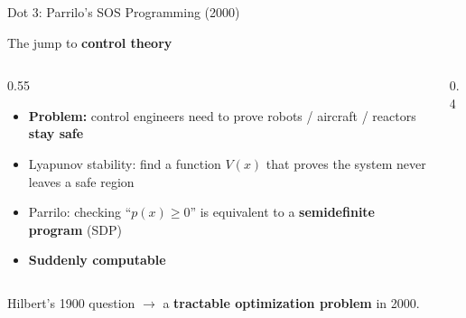 \documentclass[aspectratio=169]{beamer}
\begin{document}
\begin{frame}{Dot 3: Parrilo's SOS Programming (2000)}
\begin{center}
\large The jump to \textbf{control theory}
\end{center}

\vspace{0.5em}
\begin{columns}[c]
\begin{column}{0.55\textwidth}
\begin{itemize}
  \item \textbf{Problem:} control engineers need to prove robots / aircraft / reactors \textbf{stay safe}
  \item Lyapunov stability: find a function $V(x)$ that proves the system never leaves a safe region
  \item Parrilo: checking ``$p(x) \ge 0$'' is equivalent to a \textbf{semidefinite program} (SDP)
  \item \textbf{Suddenly computable}
\end{itemize}
\end{column}
\begin{column}{0.4\textwidth}
\centering
{}
\end{column}
\end{columns}

\vspace{0.8em}
\centering
\textcolor{control}{\faLightbulb}\; Hilbert's 1900 question $\to$ a \textbf{tractable optimization problem} in 2000.
\end{frame}

\end{document}
